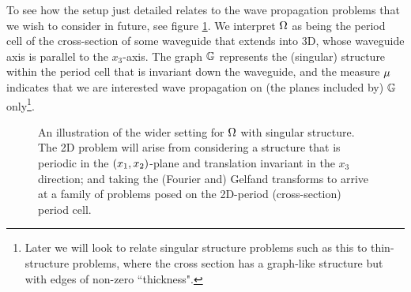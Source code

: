 To see how the setup just detailed relates to the wave propagation problems that we wish to consider in future, see figure \ref{fig:ScalarStrucDiagram}.
We interpret $\Omega$ as being the period cell of the cross-section of some waveguide that extends into 3D, whose waveguide axis is parallel to the $x_3$-axis.
The graph $\mathbb{G}$ represents the (singular) structure within the period cell that is invariant down the waveguide, and the measure $\mu$ indicates that we are interested wave propagation on (the planes included by) $\mathbb{G}$ only\footnote{Later we will look to relate singular structure problems such as this to thin-structure problems, where the cross section has a graph-like structure but with edges of non-zero ``thickness".}.
\begin{figure}[h!]
	\centering
	\caption{\label{fig:ScalarStrucDiagram} An illustration of the wider setting for $\Omega$ with singular structure. The 2D problem will arise from considering a structure that is periodic in the $\left( x_1,x_2 \right)$-plane and translation invariant in the $x_3$ direction; and taking the (Fourier and) Gelfand transforms to arrive at a family of problems posed on the 2D-period (cross-section) period cell.}
\end{figure}

